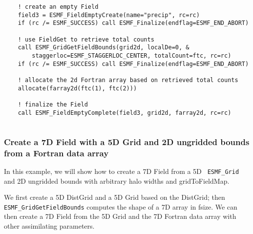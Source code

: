 
 \begin{verbatim}
    ! create an empty Field
    field3 = ESMF_FieldEmptyCreate(name="precip", rc=rc)
    if (rc /= ESMF_SUCCESS) call ESMF_Finalize(endflag=ESMF_END_ABORT)

    ! use FieldGet to retrieve total counts
    call ESMF_GridGetFieldBounds(grid2d, localDe=0, &
        staggerloc=ESMF_STAGGERLOC_CENTER, totalCount=ftc, rc=rc)
    if (rc /= ESMF_SUCCESS) call ESMF_Finalize(endflag=ESMF_END_ABORT)

    ! allocate the 2d Fortran array based on retrieved total counts
    allocate(farray2d(ftc(1), ftc(2)))

    ! finalize the Field
    call ESMF_FieldEmptyComplete(field3, grid2d, farray2d, rc=rc)
 
\end{verbatim}
 

  \subsubsection{Create a 7D Field with a 5D Grid and 2D ungridded bounds
   from a Fortran data array}
  \label{sec:field:usage:create_5dgrid_7dptr_2dungridded}
  
   In this example, we will show how to create a 7D Field from a 5D {\tt
   ESMF\_Grid} and 2D ungridded bounds with arbitrary halo widths and
   gridToFieldMap.
  
   We first create a 5D DistGrid and a 5D Grid based on the DistGrid; then
   {\tt ESMF\_GridGetFieldBounds} computes the shape of a 7D array in fsize. We can then
   create a 7D Field from the 5D Grid and the 7D Fortran data array with
   other assimilating parameters. 

